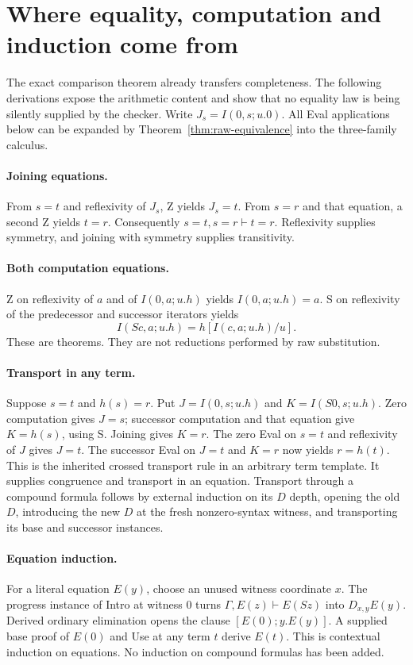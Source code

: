 \section{Where equality, computation and induction come from}
\label{sec:bootstrap}

The exact comparison theorem already transfers completeness. The following
derivations expose the arithmetic content and show that no equality law is
being silently supplied by the checker. Write
$J_s=I(0,s;u.0)$. All Eval applications below can be expanded by
Theorem~\ref{thm:raw-equivalence} into the three-family calculus.

\paragraph{Joining equations.}
From $s=t$ and reflexivity of $J_s$, Z yields $J_s=t$.
From $s=r$ and that equation, a second Z yields $t=r$.
Consequently $s=t,s=r\vdash t=r$. Reflexivity supplies symmetry, and
joining with symmetry supplies transitivity.

\paragraph{Both computation equations.}
Z on reflexivity of $a$ and of $I(0,a;u.h)$ yields
$I(0,a;u.h)=a$. S on reflexivity of the predecessor and successor
iterators yields
\[
           I(Sc,a;u.h)=h[I(c,a;u.h)/u].
\]
These are theorems. They are not reductions performed by raw substitution.

\paragraph{Transport in any term.}
Suppose $s=t$ and $h(s)=r$. Put
$J=I(0,s;u.h)$ and $K=I(S0,s;u.h)$.
Zero computation gives $J=s$; successor computation and that equation
give $K=h(s)$, using S. Joining gives $K=r$.
The zero Eval on $s=t$ and reflexivity of $J$ gives $J=t$.
The successor Eval on $J=t$ and $K=r$ now yields $r=h(t)$.
This is the inherited crossed transport rule in an arbitrary term template.
It supplies congruence and transport in an equation. Transport through a
compound formula follows by external induction on its $D$ depth, opening
the old $D$, introducing the new $D$ at the fresh nonzero-syntax witness,
and transporting its base and successor instances.

\paragraph{Equation induction.}
For a literal equation $E(y)$, choose an unused witness coordinate $x$.
The progress instance of Intro at witness $0$ turns
$\Gamma,E(z)\vdash E(Sz)$ into $D_{x,y}E(y)$. Derived ordinary elimination
opens the clause $[E(0);y.E(y)]$. A supplied base proof of $E(0)$ and Use
at any term $t$ derive $E(t)$. This is contextual induction on equations.
No induction on compound formulas has been added.

